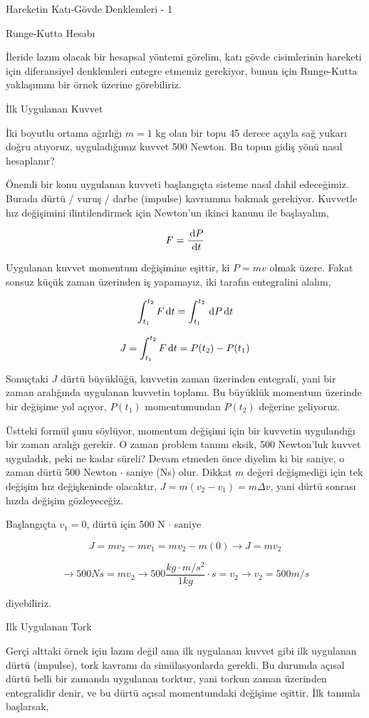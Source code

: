 \documentclass[12pt,fleqn]{article}\usepackage{../../common}
\begin{document}
Hareketin Katı-Gövde Denklemleri - 1

Runge-Kutta Hesabı

İleride lazım olacak bir hesapsal yöntemi görelim, katı gövde cisimlerinin
hareketi için diferansiyel denklemleri entegre etmemiz gerekiyor, bunun
için Runge-Kutta yaklaşımını bir örnek üzerine görebiliriz.

İlk Uygulanan Kuvvet

İki boyutlu ortama ağırlığı $m=1$ kg olan bir topu 45 derece açıyla sağ yukarı
doğru atıyoruz, uyguladığımız kuvvet 500 Newton. Bu topun gidiş yönü nasıl
hesaplanır?

Önemli bir konu uygulanan kuvveti başlangıçta sisteme nasıl dahil edeceğimiz.
Burada dürtü / vuruş / darbe (impulse) kavramına bakmak gerekiyor. Kuvvetle hız
değişimini ilintilendirmek için Newton'un ikinci kanunu ile başlayalım,

$$
F = \frac{\,\mathrm{d} P}{\,\mathrm{d} t} 
$$

Uygulanan kuvvet momentum değişimine eşittir, ki $P = mv$ olmak üzere. Fakat
sonsuz küçük zaman üzerinden iş yapamayız, iki tarafın entegralini alalım,

$$
\int_{t_1}^{t_2} F \,\mathrm{d} t = \int_{t_1}^{t_2} \,\mathrm{d} P \,\mathrm{d} t
$$

$$
J = \int_{t_1}^{t_2} F \,\mathrm{d} t = P(t_2) - P(t_1)
$$

Sonuçtaki $J$ dürtü büyüklüğü, kuvvetin zaman üzerinden entegrali, yani
bir zaman aralığında uygulanan kuvvetin toplamı. Bu büyüklük momentum
üzerinde bir değişime yol açıyor, $P(t_1)$ momentumundan $P(t_2)$
değerine geliyoruz.

Üstteki formül şunu söylüyor, momentum değişimi için bir kuvvetin uygulandığı
bir zaman aralığı gerekir. O zaman problem tanımı eksik, 500 Newton'luk kuvvet
uyguladık, peki ne kadar süreli? Devam etmeden önce diyelim ki bir saniye, o
zaman dürtü 500 Newton $\cdot$ saniye (Ns) olur. Dikkat $m$ değeri değişmediği
için tek değişim hız değişkeninde olacaktır, $J = m(v_2 - v_1) = m \Delta v$,
yani dürtü sonrası hızda değişim gözleyeceğiz.

Başlangıçta $v_1=0$, dürtü için 500 N $\cdot$ saniye

$$
J = m v_2 - m v_1 = m v_2 - m(0) \to J = m v_2
$$

$$
\to 500 Ns = m v_2
\to 500 \frac{kg \cdot m/s^2}{1 kg } \cdot s = v_2
\to v_2 = 500 m/s
$$

diyebiliriz.

Ilk Uygulanan Tork

Gerçi alttaki örnek için lazım değil ama ilk uygulanan kuvvet gibi ilk uygulanan
dürtü (impulse), tork kavramı da simülasyonlarda gerekli. Bu durumda açısal
dürtü belli bir zamanda uygulanan torktur, yani torkun zaman üzerinden
entegralidir denir, ve bu dürtü açısal momentumdaki değişime eşittir. İlk
tanımla başlarsak,
\end{document}

